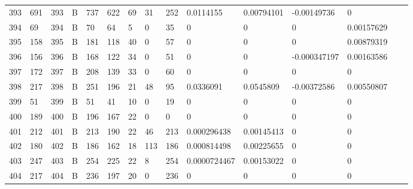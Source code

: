\begin{longtable}{lllllllllllllll}
	393 & 691               & 393 & B   & 737               & 622               & 69                & 31   & 252        & 0.0114155      & 0.00794101     & -0.00149736   & 0            \\
	394 & 69                & 394 & B   & 70                & 64                & 5                 & 0    & 35         & 0              & 0              & 0             & 0.00157629   \\
	395 & 158               & 395 & B   & 181               & 118               & 40                & 0    & 57         & 0              & 0              & 0             & 0.00879319   \\
	396 & 156               & 396 & B   & 168               & 122               & 34                & 0    & 51         & 0              & 0              & -0.000347197  & 0.00163586   \\
	397 & 172               & 397 & B   & 208               & 139               & 33                & 0    & 60         & 0              & 0              & 0             & 0            \\
	398 & 217               & 398 & B   & 251               & 196               & 21                & 48   & 95         & 0.0336091      & 0.0545809      & -0.00372586   & 0.00550807   \\
	399 & 51                & 399 & B   & 51                & 41                & 10                & 0    & 19         & 0              & 0              & 0             & 0            \\
	400 & 189               & 400 & B   & 196               & 167               & 22                & 0    & 0          & 0              & 0              & 0             & 0            \\
	401 & 212               & 401 & B   & 213               & 190               & 22                & 46   & 213        & 0.000296438    & 0.00145413     & 0             & 0            \\
	402 & 180               & 402 & B   & 186               & 162               & 18                & 113  & 186        & 0.000814498    & 0.00225655     & 0             & 0            \\
	403 & 247               & 403 & B   & 254               & 225               & 22                & 8    & 254        & 0.0000724467   & 0.00153022     & 0             & 0            \\
	404 & 217               & 404 & B   & 236               & 197               & 20                & 0    & 236        & 0              & 0              & 0             & 0            \\

\end{longtable}
